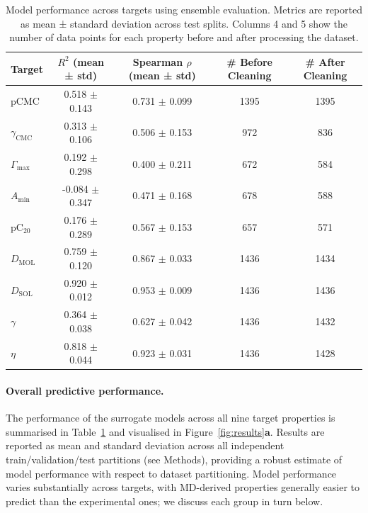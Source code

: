 \documentclass[11pt]{aime}
\begin{document}
\begin{table}[ht]
\centering
\small
\begin{tabular}{lcccc}
\toprule
\textbf{Target} & \textbf{$R^2$ (mean ± std)} & \textbf{Spearman $\rho$ (mean ± std)} & \textbf{\# Before Cleaning} & \textbf{\# After Cleaning}  \\
\midrule
pCMC & 0.518 $\pm$ 0.143 & 0.731 $\pm$ 0.099 & 1395 & 1395 \\
$\gamma_{\mathrm{CMC}}$ & 0.313 $\pm$ 0.106 & 0.506 $\pm$ 0.153 & 972 & 836  \\
$\Gamma_{\max}$ & 0.192 $\pm$ 0.298 & 0.400 $\pm$ 0.211 & 672 & 584 \\
$A_{\min}$ & -0.084 $\pm$ 0.347 & 0.471 $\pm$ 0.168 & 678 & 588 \\
pC$_{20}$ & 0.176 $\pm$ 0.289 & 0.567 $\pm$ 0.153 & 657 & 571  \\
$D_{\mathrm{MOL}}$ & 0.759 $\pm$ 0.120 & 0.867 $\pm$ 0.033 & 1436 & 1434 \\
$D_{\mathrm{SOL}}$ & 0.920 $\pm$ 0.012 & 0.953 $\pm$ 0.009 & 1436 & 1436 \\
$\gamma$ & 0.364 $\pm$ 0.038 & 0.627 $\pm$ 0.042 & 1436 & 1432 \\
$\eta$ & 0.818 $\pm$ 0.044 & 0.923 $\pm$ 0.031 & 1436 & 1428 \\
\bottomrule
\end{tabular}
\caption{Model performance across targets using ensemble evaluation.
Metrics are reported as mean ± standard deviation across test splits.
Columns 4 and 5 show the number of data points for each property before and after processing the dataset. }
\label{tab:results:model_performance}
\end{table}

\paragraph{Overall predictive performance.}
The performance of the surrogate models across all nine target properties is summarised in Table~\ref{tab:results:model_performance} and visualised in Figure~\ref{fig:results}\textbf{a}.
Results are reported as mean and standard deviation across all independent train/validation/test partitions (see Methods), providing a robust estimate of model performance with respect to dataset partitioning.
Model performance varies substantially across targets, with MD-derived properties generally easier to predict than the experimental ones;
we discuss each group in turn below.
\end{document}
